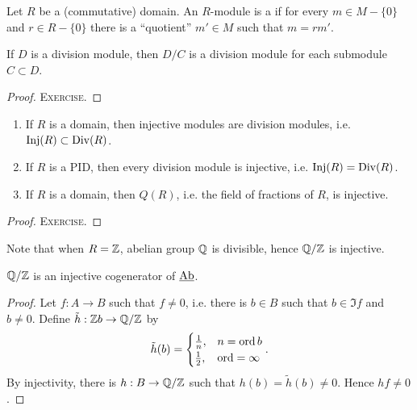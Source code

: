 \begin{definition*}
	Let \( R \) be a (commutative) domain. An \( R \)-module is a  if for every \( m \in M \minus \{0\} \) and \( r \in R \minus \{0\} \) there is a \enquote{quotient} \( m' \in M \) such that \( m = rm' \).
\end{definition*}

\begin{proposition*}
	If \( D \) is a division module, then \( D/C \) is a division module for each submodule \( C \subset D \).
\end{proposition*}
\begin{proof}
	\textsc{Exercise}.
\end{proof}

\newpage

\begin{proposition*}
	\hfill
	\begin{enumerate}
		\item If \( R \) is a domain, then injective modules are division modules, i.e.\( \operatorname{Inj}(R) \subset \operatorname{Div}(R) \).
		\item If \( R \) is a PID, then every division module is injective, i.e. \( \operatorname{Inj}(R) = \operatorname{Div}(R) \).
		\item If \( R \) is a domain, then \( Q(R) \), i.e. the field of fractions of \( R \), is injective.
	\end{enumerate}
\end{proposition*}
\begin{proof}
	\textsc{Exercise}.
\end{proof}

Note that when \( R = \mathbb{Z} \), abelian group \( \mathbb{Q} \) is divisible, hence \( \mathbb{Q}/\mathbb{Z} \) is injective.

\begin{proposition*}
	\( \mathbb{Q}/\mathbb{Z} \) is an injective cogenerator of \( \underline{\mathrm{Ab}} \).
\end{proposition*}
\begin{proof}
	Let \( f: A \to B \) such that \( f \neq 0 \), i.e. there is \( b \in B \) such that \( b \in \Im f \) and \( b \neq 0 \). Define \( \tilde{h}: \mathbb{Z}b \to \mathbb{Q}/\mathbb{Z} \) by
	\[\tilde{h}(b) =
		\begin{cases}
			\frac{1}{n}, & n = \operatorname{ord} b    \\
			\frac{1}{2}, & \operatorname{ord} = \infty
		\end{cases}
		.\]
	By injectivity, there is \( h: B \to \mathbb{Q}/\mathbb{Z} \) such that \( h(b) = \tilde{h}(b) \neq 0 \). Hence \( hf \neq 0 \).
\end{proof}

